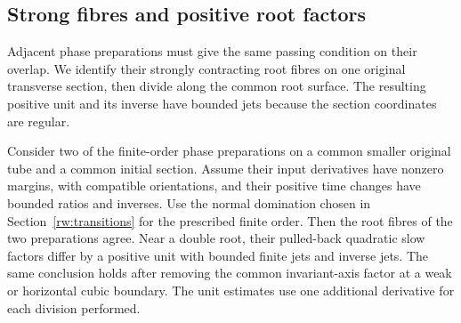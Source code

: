 \subsection{Strong fibres and positive root factors}

Adjacent phase preparations must give the same passing condition on
their overlap. We identify their strongly contracting root fibres on
one original transverse section, then divide along the common root
surface. The resulting positive unit and its inverse have bounded
jets because the section coordinates are regular.

\begin{proposition}
\label{rw:phase-compatibility}
Consider two of the finite-order phase preparations on a common smaller
original tube and a common initial section. Assume their input derivatives
have nonzero margins, with compatible orientations, and their positive
time changes have bounded ratios and inverses. Use the normal domination
chosen in Section~\ref{rw:transitions} for the prescribed finite order.
Then the root fibres of the two preparations agree. Near a double root,
their pulled-back quadratic slow factors differ by a positive unit with
bounded finite jets and inverse jets. The same conclusion holds after
removing the common invariant-axis factor at a weak or horizontal cubic
boundary. The unit estimates use one additional derivative for each
division performed.
\end{proposition}

